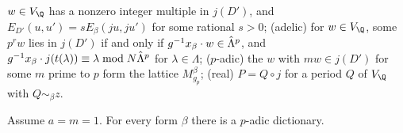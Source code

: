 \begin{definition}
\begin{enumerate}
  $w\in V_\Q$ has a nonzero integer multiple in $j(D')$, and $E_{D'}(u,u')=sE_\beta(ju,ju')$ for some
  rational $s>0$; (adelic) for $w\in V_\Q$, some $p^rw$ lies in $j(D')$ if and only if
  $g^{-1}x_\beta\cdot w\in\hat\Lambda^{p}$, and $g^{-1}x_\beta\cdot j(t(\lambda))\equiv\lambda\bmod
  N\hat\Lambda^{p}$ for $\lambda\in\Lambda$; ($p$-adic) the $w$ with $mw\in j(D')$ for some $m$ prime to
  $p$ form the lattice $M^\beta_{g_p}$; (real) $P=Q\circ j$ for a period $Q$ of $V_\Q$ with
  $Q\sim_\beta z$.
\end{enumerate}
\end{definition}

\begin{proposition}\label{pf:ks2:pdic}
Assume $a=m=1$. For every form $\beta$ there is a $p$-adic dictionary.
\end{proposition}

